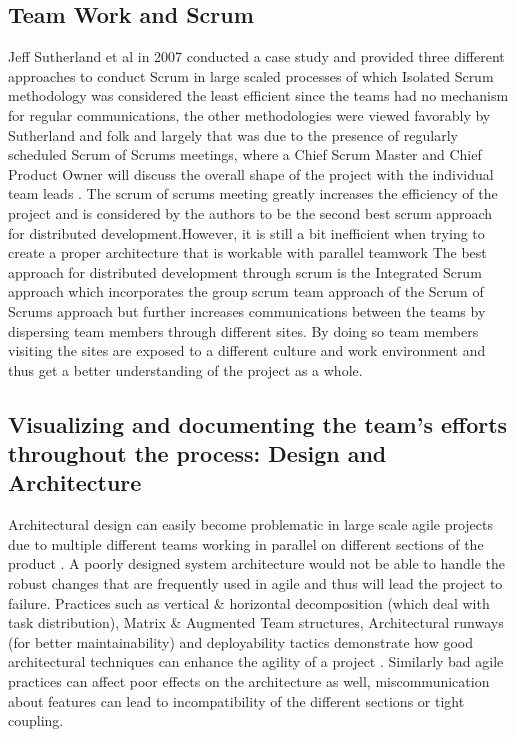 \documentclass[sigplan,screen]{acmart}
\begin{document}
\subsection{Team Work and Scrum}
Jeff Sutherland et al in 2007 conducted a case study and provided three different approaches to conduct Scrum in large scaled processes of which Isolated Scrum methodology was considered the least efficient since the teams had no mechanism for regular communications, the other methodologies were viewed favorably by Sutherland and folk and largely that was due to the presence of regularly scheduled Scrum of Scrums meetings, where a Chief Scrum Master and Chief Product Owner will discuss the overall shape of the project with the individual team leads \cite{Jeff}. The scrum of scrums meeting greatly increases the efficiency of the project and is considered by the authors to be the second best scrum approach for distributed development.However, it is still a bit inefficient when trying to create a proper architecture that is workable with parallel teamwork \cite{Dingsøyr14} The best approach for distributed development through scrum is the Integrated Scrum approach which incorporates the group scrum team approach of the Scrum of Scrums approach but further increases communications between the teams by dispersing team members through different sites. By doing so team members visiting the sites are exposed to a different culture and work environment and thus get a better understanding of the project as a whole.\\ 

\subsection{Visualizing and documenting the team's efforts throughout the process: Design and Architecture}
Architectural design can easily become problematic in large scale agile projects due to multiple different teams working in parallel on different sections of the product \cite{Dingsøyr14}. A poorly designed system architecture would not be able to handle the robust changes that are frequently used in agile and thus will lead the project to failure. Practices such as vertical & horizontal decomposition (which deal with task distribution), Matrix & Augmented Team structures, Architectural runways (for better maintainability) and deployability tactics demonstrate how good architectural techniques can enhance the agility of a project \cite{Nord}. Similarly bad agile practices can affect poor effects on the architecture as well, miscommunication about features can lead to incompatibility of the different sections or tight coupling. 
\end{document}
